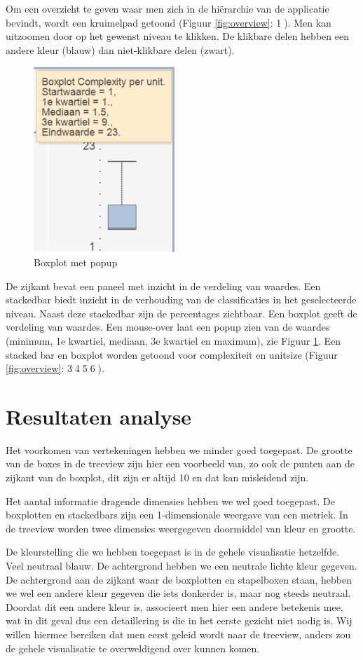 \documentclass[a4paper]{article}
\begin{document}
Om een overzicht te geven waar men zich in de hiërarchie van de applicatie bevindt, wordt een kruimelpad getoond (Figuur \ref{fig:overview}: \textcircled{1}). Men kan uitzoomen door op het gewenst niveau te klikken. De klikbare delen hebben een andere kleur (blauw) dan niet-klikbare delen (zwart).
\begin{figure}[ht]
\centering
  \includegraphics{images/boxplot_popup.png}
  \caption{Boxplot met popup}
  \label{fig:boxplot_popup}
\end{figure}


De zijkant bevat een paneel met inzicht in de verdeling van waardes. Een stackedbar biedt inzicht in de verhouding van de classificaties in het geselecteerde niveau. Naast deze stackedbar zijn de percentages zichtbaar. Een boxplot geeft de verdeling van waardes. Een mouse-over laat een popup zien van de waardes (minimum, 1e kwartiel, mediaan, 3e kwartiel en maximum), zie Figuur \ref{fig:boxplot_popup}.
Een stacked bar en boxplot worden getoond voor complexiteit en unitsize (Figuur \ref{fig:overview}: \textcircled{3}\textcircled{4}\textcircled{5}\textcircled{6}).


\section{Resultaten analyse}
Het voorkomen van vertekeningen hebben we minder goed toegepast. De grootte van de boxes in de treeview zijn hier een voorbeeld van, zo ook de punten aan de zijkant van de boxplot, dit zijn er altijd 10 en dat kan misleidend zijn.

Het aantal informatie dragende dimensies hebben we wel goed toegepast. De boxplotten en stackedbars zijn een 1-dimensionale weergave van een metriek. In de treeview worden twee dimensies weergegeven doormiddel van kleur en grootte. 

De kleurstelling die we hebben toegepast is in de gehele visualisatie hetzelfde. Veel neutraal blauw. De achtergrond hebben we een neutrale lichte kleur gegeven. De achtergrond aan de zijkant waar de boxplotten en stapelboxen staan, hebben we wel een andere kleur gegeven die iets donkerder is, maar nog steeds neutraal. Doordat dit een andere kleur is, associeert men hier een andere betekenis mee, wat in dit geval dus een detaillering is die in het eerste gezicht niet nodig is. Wij willen hiermee bereiken dat men eerst geleid wordt naar de treeview, anders zou de gehele visualisatie te overweldigend over kunnen komen.
\end{document}
